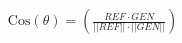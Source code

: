 \documentclass[preview]{standalone}
\begin{document}
\begin{align*}
\text{Cos}(\theta) = \left(\frac{REF \cdot GEN}{||REF|| \cdot ||GEN||}\right)
\end{align*}
\end{document}
